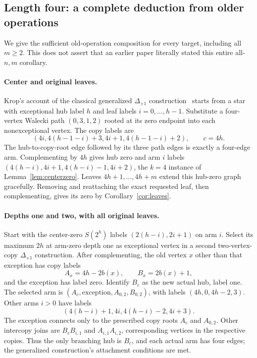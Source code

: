 \documentclass[11pt,a4paper]{article}
\theoremstyle{definition}\newtheorem{definition}[theorem]{Definition}
\theoremstyle{remark}\newtheorem{remark}[theorem]{Remark}
\begin{document}
\subsection{Length four: a complete deduction from older operations}
We give the sufficient old-operation composition for every target,
including all $m\ge2$. This does not assert that an earlier paper
literally stated this entire all-$n,m$ corollary.

\paragraph{Center and original leaves.}
Krop's account of the classical generalized $\Delta_{+1}$
construction~\cite[Theorem 2.4 and subsequent generalization]{krop}
starts from a star with exceptional hub label $h$ and leaf labels
$i=0,\ldots,h-1$. Substitute a four-vertex Walecki path
$(0,3,1,2)$ rooted at its zero endpoint into each nonexceptional
vertex. The copy labels are
\[
 (4i,4(h-1-i)+3,4i+1,4(h-1-i)+2),\qquad c=4h.
\]
The hub-to-copy-root edge followed by its three path edges is
exactly a four-edge arm. Complementing by $4h$ gives hub zero and
arm $i$ labels $(4(h-i),4i+1,4(h-i)-1,4i+2)$, the $k=4$ instance
of Lemma~\ref{lem:centerzero}. Leaves $4h+1,\ldots,4h+m$ extend
this hub-zero graph gracefully. Removing and reattaching the exact
requested leaf, then complementing, gives its zero by
Corollary~\ref{cor:leaves}.

\paragraph{Depths one and two, with all original leaves.}
Start with the center-zero $S(2^h)$ labels
$(2(h-i),2i+1)$ on arm $i$. Select its maximum $2h$ at arm-zero
depth one as exceptional vertex in a second two-vertex-copy
$\Delta_{+1}$ construction. After complementing, the old vertex
$x$ other than that exception has copy labels
\[
 A_x=4h-2b(x),\qquad B_x=2b(x)+1,
\]
and the exception has label zero. Identify $B_c$ as the new actual
hub, label one. The selected arm is
$(A_c,\text{exception},A_{0,2},B_{0,2})$, with labels
$(4h,0,4h-2,3)$. Other arms $i>0$ have labels
\[
 (4(h-i)+1,4i,4(h-i)-2,4i+3).
\]
The exception connects only to the prescribed copy roots $A_c$ and
$A_{0,2}$. Other intercopy joins are $B_cB_{i,1}$ and
$A_{i,1}A_{i,2}$, corresponding vertices in the respective copies.
Thus the only branching hub is $B_c$, and each actual arm has four
edges; the generalized construction's attachment conditions are met.
\end{document}
